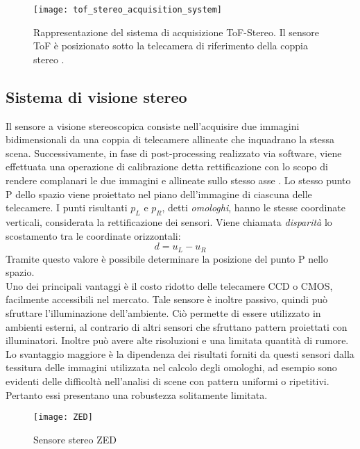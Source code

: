 \begin{figure}[ht]
    \centering
    \texttt{[image: tof\_stereo\_acquisition\_system]}
    \caption[Sistema di acquisizione ToF-Stereo]{Rappresentazione del sistema di acquisizione ToF-Stereo. Il sensore ToF è posizionato sotto la telecamera di riferimento della coppia stereo \cite{realfusion}.}
\end{figure}

\subsection{Sistema di visione stereo}
Il sensore a visione stereoscopica consiste nell'acquisire due immagini bidimensionali da una coppia di telecamere allineate che inquadrano la stessa scena. Successivamente, in fase di post-processing realizzato via software, viene effettuata una operazione di calibrazione detta rettificazione con lo scopo di rendere complanari le due immagini e allineate sullo stesso asse \cite{rif1}. Lo stesso punto P dello spazio viene proiettato nel piano dell'immagine di ciascuna delle telecamere. I punti risultanti \(p_L\) e \(p_R\), detti \textit{omologhi}, hanno le stesse coordinate verticali, considerata la rettificazione dei sensori. Viene chiamata \textit{disparità} lo scostamento tra le coordinate orizzontali: \[d = u_L - u_R\] Tramite questo valore è possibile determinare la posizione del punto P nello spazio.\\
Uno dei principali vantaggi è il costo ridotto delle telecamere CCD o CMOS, facilmente accessibili nel mercato. Tale sensore è inoltre passivo, quindi può sfruttare l’illuminazione dell’ambiente. Ciò permette di essere utilizzato in ambienti esterni, al contrario di altri sensori che sfruttano
pattern proiettati con illuminatori. Inoltre può avere alte risoluzioni e una limitata quantità di rumore.\\
Lo svantaggio maggiore è la dipendenza dei risultati forniti da questi sensori dalla tessitura delle immagini utilizzata nel calcolo degli omologhi, ad esempio sono evidenti delle difficoltà nell'analisi di scene con pattern uniformi o ripetitivi. Pertanto essi presentano una robustezza solitamente limitata.

\begin{figure}[ht]
    \centering
    \texttt{[image: ZED]}
    \caption[Sensore di visione stereo]{Sensore stereo ZED}
\end{figure}

